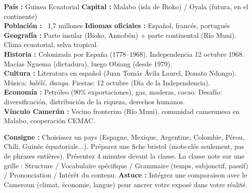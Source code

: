 \documentclass[11pt]{article}
\begin{document}
\begin{exemplebox}
\textbf{País :} Guinea Ecuatorial \quad \textbf{Capital :} Malabo (isla de Bioko) / Oyala (futura, en el continente) \\
\textbf{Población :} ~1,7 millones \quad \textbf{Idiomas oficiales :} Español, francés, portugués \\
\textbf{Geografía :} Parte insular (Bioko, Annobón) + parte continental (Río Muni). Clima ecuatorial, selva tropical. \\
\textbf{Historia :} Colonizada por España (1778--1968). Independencia 12 octubre 1968. Macías Nguema (dictadura), luego Obiang (desde 1979). \\
\textbf{Cultura :} Literatura en español (Juan Tomás Ávila Laurel, Donato Ndongo). Música: \emph{balélé}, \emph{ibanga}. Fiestas: 12 octubre (Día de la Independencia). \\
\textbf{Economía :} Petróleo (90\% exportaciones), gas, maderas, cacao. Desafío: diversificación, distribución de la riqueza, derechos humanos. \\
\textbf{Vínculo Camerún :} Vecino fronterizo (Río Muni), comunidad camerunesa en Malabo, cooperación CEMAC.
\end{exemplebox}

\begin{experience}
\textbf{Consigne :} Choisissez un pays (Espagne, Mexique, Argentine, Colombie, Pérou, Chili, Guinée équatoriale...). Préparez une fiche bristol (mots-clés seulement, pas de phrases entières). Présentez 4 minutes devant la classe. La classe note sur une grille : Structure / Vocabulaire spécifique / Grammaire (temps, subjonctif, passif) / Prononciation / Intérêt du contenu.
\textbf{Astuce :} Intégrez une comparaison avec le Cameroun (climat, économie, langue) pour ancrer votre exposé dans votre réalité.
\end{experience}
\end{document}
